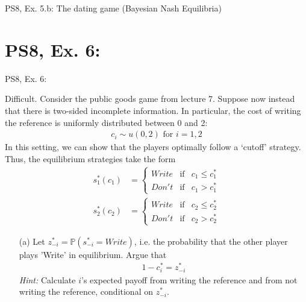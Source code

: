 \begin{frame}{PS8, Ex. 5.b: The dating game (Bayesian Nash Equilibria)}
  \begin{multicols}{2}
    \vfill\null\columnbreak
    \vfill\null
  \end{multicols}
\end{frame}



\section{PS8, Ex. 6: }

\begin{frame}{PS8, Ex. 6: }
  \begin{multicols}{2}
    Difficult. Consider the public goods game from lecture 7. Suppose now instead that there is two-sided incomplete information. In particular, the cost of writing the reference is uniformly distributed between 0 and 2:
    \begin{align*}
      c_i\sim u(0,2)\text{ for }i=1,2
    \end{align*}
    In this setting, we can show that the players optimally follow a ‘cutoff’ strategy. Thus, the equilibrium strategies take the form
    \begin{align*}
      s_1^*(c_1)&=\left\{\begin{array}{rcl}
        Write & \text{if} & c_1\leq c_1^*\\
        Don't & \text{if} & c_1>c_1^*
        \end{array}\right.\\
      s_2^*(c_2)&=\left\{\begin{array}{rcl}
        Write & \text{if} & c_2\leq c_2^*\\
        Don't & \text{if} & c_2>c_2^*
        \end{array}\right.
    \end{align*}
    \vfill\null\columnbreak
    \begin{itemize}
      \item[(a)] Let $z_{-i}^* = \mathbb{P}(s_{-i}^*=Write)$, i.e. the probability that the other player plays 'Write' in equilibrium. Argue that
      \vspace{-18pt}
      \begin{align}
        1-c_i^*=z_{-i}^*\label{7a}
      \end{align}
      \textit{Hint:} Calculate $i$'s expected payoff from writing the reference and from not writing the reference, conditional on $z_{-i}^*$.

\end{itemize}
\end{multicols}
\end{frame}
